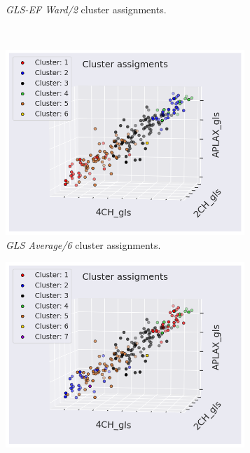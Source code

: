 \begin{figure}[H]
\begin{subfigure}[b]{0.49\textwidth}
        \caption{\textit{GLS-EF Ward/2} cluster assignments.}
        \label{fig:scatter_gls_ef_ward2_ind}
    \end{subfigure}\\
    \begin{subfigure}[b]{0.49\textwidth}
        \centering
        \includegraphics[width=0.99\textwidth]{results/pd/scatter_gls_average6.png}
        \caption{\textit{GLS Average/6} cluster assignments.}
        \label{fig:scatter_gls_average6}
    \end{subfigure}
    \begin{subfigure}[b]{0.49\textwidth}
        \centering
        \includegraphics[width=0.99\textwidth]{results/pd/scatter_gls_average7.png}

\end{subfigure}
\end{figure}
